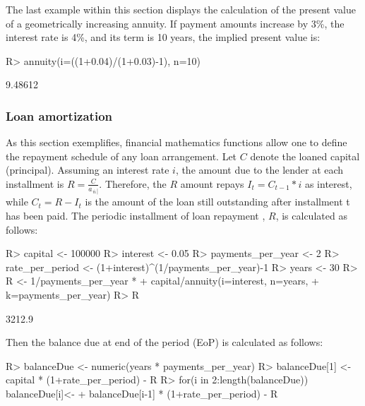 \documentclass[nojss]{jss}
\begin{document}
The last example within this section displays the calculation of the present
value of a geometrically increasing annuity. If payment amounts increase by
3\%, the interest rate is 4\%, and its term is 10 years, the implied present
value is:
\begin{Schunk}
\begin{Sinput}
R> annuity(i=((1+0.04)/(1+0.03)-1), n=10)
\end{Sinput}
\begin{Soutput}
[1] 9.48612
\end{Soutput}
\end{Schunk}




\subsubsection{Loan amortization}\label{sss:finloan}

As this section exemplifies,  financial mathematics functions allow one to define the 
repayment schedule of any loan arrangement. Let $C$ denote the loaned capital (principal). Assuming an interest rate $i$, the amount due to the lender at each installment is $R =\frac{C}{a_{\left. {\overline {\, n \,}}\! \right| }}$.
Therefore, the $R$ amount repays $I_t = C_{t-1} * i$ as interest, while  $C_t = R - I_t$ is the amount of the loan still outstanding after installment t has been paid. The periodic installment of loan repayment , $R$, is
calculated as follows:

\begin{Schunk}
\begin{Sinput}
R> capital <- 100000
R> interest <- 0.05 
R> payments_per_year <- 2
R> rate_per_period <- (1+interest)^(1/payments_per_year)-1
R> years <- 30
R> R <- 1/payments_per_year * 
+  capital/annuity(i=interest, n=years, 
+  		k=payments_per_year)
R> R
\end{Sinput}
\begin{Soutput}
[1] 3212.9
\end{Soutput}
\end{Schunk}
Then the balance due at end of the period (EoP) is calculated as follows:
\begin{Schunk}
\begin{Sinput}
R> balanceDue <- numeric(years * payments_per_year)
R> balanceDue[1] <- capital * (1+rate_per_period) - R
R> for(i in 2:length(balanceDue)) balanceDue[i]<-
+    balanceDue[i-1] * (1+rate_per_period) - R
\end{Sinput}
\end{Schunk}
\end{document}
